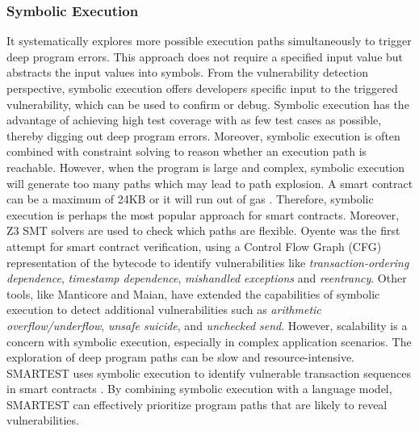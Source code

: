 \documentclass[manuscript,screen]{acmart}
\begin{document}
\subsubsection{Symbolic Execution}
It systematically explores more possible execution paths simultaneously to trigger deep program errors. This approach does not require a specified input value but abstracts the input values into symbols. From the vulnerability detection perspective, symbolic execution offers developers specific input to the triggered vulnerability, which can be used to confirm or debug. Symbolic execution has the advantage of achieving high test coverage with as few test cases as possible, thereby digging out deep program errors. 
Moreover, symbolic execution is often combined with constraint solving to reason whether an execution path is reachable. However, when the program is large and complex, symbolic execution will generate too many paths which may lead to path explosion. A smart contract can be a maximum of 24KB or it will run out of gas \cite{Ehtereum}. Therefore, symbolic execution is perhaps the most popular approach for smart contracts. Moreover, Z3 SMT solvers are used to check which paths are flexible. 
Oyente \cite{LuuCOSH16} was the first attempt for smart contract verification, using a Control Flow Graph (CFG) representation of the bytecode to identify vulnerabilities like \textit{transaction-ordering dependence}, \textit{timestamp dependence}, \textit{mishandled exceptions} and \textit{reentrancy}. Other tools, like Manticore and Maian, have extended the capabilities of symbolic execution to detect additional vulnerabilities such as \textit{arithmetic overflow/underflow}, \textit{unsafe suicide},  and \textit{unchecked send}. 
However, scalability is a concern with symbolic execution, especially in complex application scenarios. The exploration of deep program paths can be slow and resource-intensive. SMARTEST uses symbolic execution to  identify vulnerable transaction sequences in smart contracts \cite{SoHO21}. By combining symbolic execution with a language model, SMARTEST can effectively prioritize program paths that are likely to reveal vulnerabilities.
\end{document}
